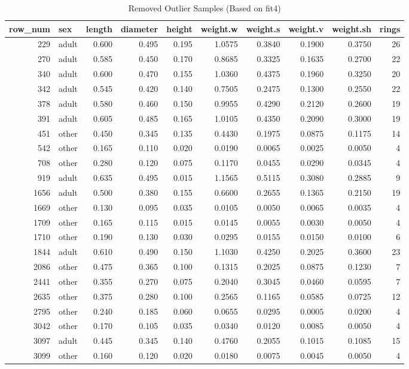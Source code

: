 \documentclass[12pt]{article}
\begin{document}
	\begin{table}[!h]
		\centering
		\caption{\label{tab:Influencial_Points4}Removed Outlier Samples (Based on fit4)}
		\begin{tabular}{r l r r r r r r r r}
			\toprule
			row\_num & sex & length & diameter & height & weight.w & weight.s & weight.v & weight.sh & rings\\
			\midrule
			229  & adult & 0.600 & 0.495 & 0.195 & 1.0575 & 0.3840 & 0.1900 & 0.3750 & 26\\
			270  & adult & 0.585 & 0.450 & 0.170 & 0.8685 & 0.3325 & 0.1635 & 0.2700 & 22\\
			340  & adult & 0.600 & 0.470 & 0.155 & 1.0360 & 0.4375 & 0.1960 & 0.3250 & 20\\
			342  & adult & 0.545 & 0.420 & 0.140 & 0.7505 & 0.2475 & 0.1300 & 0.2550 & 22\\
			378  & adult & 0.580 & 0.460 & 0.150 & 0.9955 & 0.4290 & 0.2120 & 0.2600 & 19\\
			391  & adult & 0.605 & 0.485 & 0.165 & 1.0105 & 0.4350 & 0.2090 & 0.3000 & 19\\
			451  & other & 0.450 & 0.345 & 0.135 & 0.4430 & 0.1975 & 0.0875 & 0.1175 & 14\\
			542  & other & 0.165 & 0.110 & 0.020 & 0.0190 & 0.0065 & 0.0025 & 0.0050 & 4\\
			708  & other & 0.280 & 0.120 & 0.075 & 0.1170 & 0.0455 & 0.0290 & 0.0345 & 4\\
			919  & adult & 0.635 & 0.495 & 0.015 & 1.1565 & 0.5115 & 0.3080 & 0.2885 & 9\\
			1656 & adult & 0.500 & 0.380 & 0.155 & 0.6600 & 0.2655 & 0.1365 & 0.2150 & 19\\
			1669 & other & 0.130 & 0.095 & 0.035 & 0.0105 & 0.0050 & 0.0065 & 0.0035 & 4\\
			1709 & other & 0.165 & 0.115 & 0.015 & 0.0145 & 0.0055 & 0.0030 & 0.0050 & 4\\
			1710 & other & 0.190 & 0.130 & 0.030 & 0.0295 & 0.0155 & 0.0150 & 0.0100 & 6\\
			1844 & adult & 0.610 & 0.490 & 0.150 & 1.1030 & 0.4250 & 0.2025 & 0.3600 & 23\\
			2086 & other & 0.475 & 0.365 & 0.100 & 0.1315 & 0.2025 & 0.0875 & 0.1230 & 7\\
			2441 & other & 0.355 & 0.270 & 0.075 & 0.2040 & 0.3045 & 0.0460 & 0.0595 & 7\\
			2635 & other & 0.375 & 0.280 & 0.100 & 0.2565 & 0.1165 & 0.0585 & 0.0725 & 12\\
			2795 & other & 0.240 & 0.185 & 0.060 & 0.0655 & 0.0295 & 0.0005 & 0.0200 & 4\\
			3042 & other & 0.170 & 0.105 & 0.035 & 0.0340 & 0.0120 & 0.0085 & 0.0050 & 4\\
			3097 & adult & 0.445 & 0.345 & 0.140 & 0.4760 & 0.2055 & 0.1015 & 0.1085 & 15\\
			3099 & other & 0.160 & 0.120 & 0.020 & 0.0180 & 0.0075 & 0.0045 & 0.0050 & 4\\
			\bottomrule
		\end{tabular}
	\end{table}
	
\end{document}

